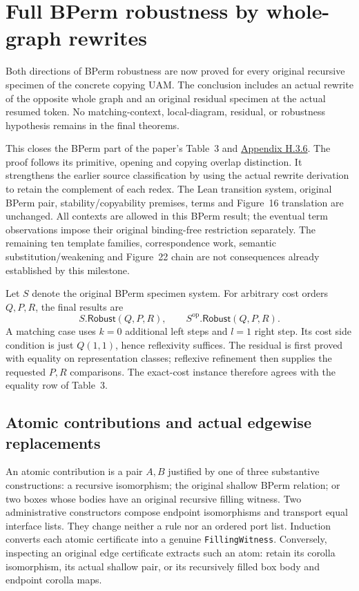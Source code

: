 \clearpage
\section{Full BPerm robustness by whole-graph rewrites}
\label{sec:copying-full-bperm}
Both directions of BPerm robustness are now proved for every original
recursive specimen of the concrete copying UAM. The conclusion includes an
actual rewrite of the opposite whole graph and an original residual specimen
at the actual resumed token. No matching-context, local-diagram, residual,
or robustness hypothesis remains in the final theorems.

This closes the BPerm part of the paper's Table~3 and
\href{https://arxiv.org/html/1907.01257v5\#A8.SS3.SSS6}{Appendix H.3.6}.
The proof follows its primitive, opening and copying overlap distinction.
It strengthens the earlier source classification by using the actual rewrite
derivation to retain the complement of each redex. The Lean transition
system, original BPerm pair, stability/copyability premises, terms and
Figure~16 translation are unchanged. All contexts are allowed in this
BPerm result; the eventual term observations impose their original
binding-free restriction separately. The remaining ten template families,
correspondence work, semantic substitution/weakening and Figure~22 chain are
not consequences already established by this milestone.

Let $S$ denote the original BPerm specimen system. For arbitrary cost orders
$Q,P,R$, the final results are
\[
 S.\mathsf{Robust}(Q,P,R),\qquad
 S^{\mathrm{op}}.\mathsf{Robust}(Q,P,R).
\]
A matching case uses $k=0$ additional left steps and $l=1$ right step.
Its cost side condition is just $Q(1,1)$, hence reflexivity suffices.
The residual is first proved with equality on representation classes;
reflexive refinement then supplies the requested $P,R$ comparisons.
The exact-cost instance therefore agrees with the equality row of Table~3.


\subsection{Atomic contributions and actual edgewise replacements}
An atomic contribution is a pair $A,B$ justified by one of three substantive
constructions: a recursive isomorphism; the original shallow BPerm relation;
or two boxes whose bodies have an original recursive filling witness.
Two administrative constructors compose endpoint isomorphisms and transport
equal interface lists. They change neither a rule nor an ordered port list.
Induction converts each atomic certificate into a genuine
\texttt{FillingWitness}. Conversely, inspecting an original edge certificate
extracts such an atom: retain its corolla isomorphism, its actual shallow
pair, or its recursively filled box body and endpoint corolla maps.

